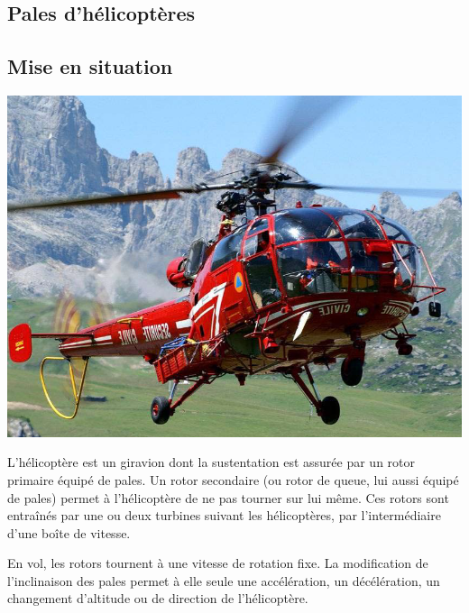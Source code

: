 \documentclass[10pt,fleqn]{article} %
\begin{document}

\vspace{4.4cm}
\pagestyle{fancy}
\thispagestyle{plain}


\def\columnseprulecolor{\color{ocre}}
\setlength{\columnseprule}{0.4pt} 

\ifprof
\else
\begin{multicols}{2}
\fi


\section*{Pales d'hélicoptères}
\subsection*{Mise en situation}
\begin{center}
\includegraphics[width=.7\linewidth]{images/fig1}
\end{center}
L'hélicoptère est un giravion dont la sustentation est assurée par un rotor primaire équipé de pales. Un rotor secondaire (ou rotor de queue, lui aussi équipé de pales) permet à l'hélicoptère de ne pas tourner sur lui même. Ces rotors sont entraînés par une ou deux turbines suivant les hélicoptères, par l'intermédiaire d'une boîte de vitesse. 

En vol, les rotors tournent à une vitesse de rotation fixe. La modification de l'inclinaison des pales permet à elle seule une accélération, un décélération, un changement d'altitude ou de direction de l'hélicoptère.



\end{multicols}
\end{document}
